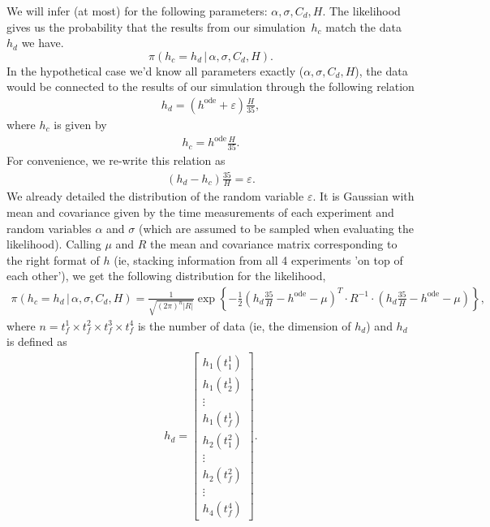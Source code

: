 \documentclass{article}
\begin{document}
We will infer (at most) for the following parameters: $\alpha, \sigma, C_d, H$. The likelihood gives us the probability that the results from our simulation~$h_c$ match the data~$h_d$ we have.
\[ \pi\left( h_c = h_d \, | \, \alpha, \sigma, C_d, H \right) .\]
In the hypothetical case we'd know all parameters exactly ($\alpha, \sigma, C_d, H$), the data would be connected to the results of our simulation through the following relation
\begin{align*}
 h_d = \left( h^\text{ode} + \varepsilon \right) \frac{H}{35} , 
\end{align*}
where $h_c$ is given by
\begin{align*}
 h_c = h^\text{ode} \frac{H}{35}.
\end{align*}
For convenience, we re-write this relation as
\begin{align*}
\left( h_d - h_c \right)\frac{35}H  = \varepsilon.
\end{align*}
We already detailed the distribution of the random variable $\varepsilon$. It is Gaussian with mean and covariance given by the time measurements of each experiment and random variables $\alpha$ and $\sigma$ (which are assumed to be sampled when evaluating the likelihood). Calling $\mu$ and $R$ the mean and covariance matrix corresponding to the right format of $h$ (ie, stacking information from all 4 experiments 'on top of each other'), we get the following distribution for the likelihood,
\begin{align*}
 \pi(h_c = h_d \, | \, \alpha, \sigma, C_d, H) = \frac1{\sqrt{(2\pi)^n |R|}} \exp \left\{ - \frac12 \left(  h_d \frac{35}H - h^\text{ode} - \mu \right)^T \cdotp R^{-1} \cdotp \left(  h_d \frac{35}H - h^\text{ode} - \mu \right) \right\} ,
\end{align*}
where $n = t_f^1 \times t_f^2 \times t_f^3 \times t_f^4$ is the number of data (ie, the dimension of $h_d$) and $h_d$ is defined as
\begin{align*}
 h_d = \begin{bmatrix}
h_1(t_1^1) \\
h_1(t_2^1) \\
\vdots \\
h_1 (t_f^1) \\
h_2(t_1^2) \\
\vdots \\
h_2(t_f^2) \\
\vdots \\
h_4(t_f^4) 
\end{bmatrix}.
\end{align*}
\end{document}
